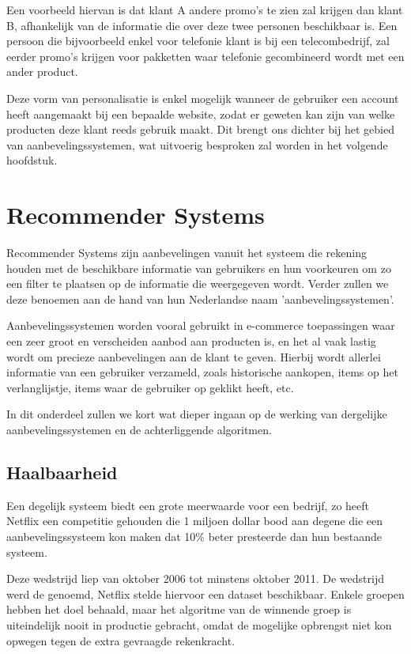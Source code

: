 Een voorbeeld hiervan is dat klant A andere promo's te zien zal krijgen dan klant B, afhankelijk van de informatie die over deze twee personen beschikbaar is. Een persoon die bijvoorbeeld enkel voor telefonie klant is bij een telecombedrijf, zal eerder promo's krijgen voor pakketten waar telefonie gecombineerd wordt met een ander product.

Deze vorm van personalisatie is enkel mogelijk wanneer de gebruiker een account heeft aangemaakt bij een bepaalde website, zodat er geweten kan zijn van welke producten deze klant reeds gebruik maakt. Dit brengt ons dichter bij het gebied van aanbevelingssystemen, wat uitvoerig besproken zal worden in het volgende hoofdstuk.

\section{Recommender Systems}
\label{sec:Recommender Systems}
Recommender Systems \autocite{Resnick1997} zijn aanbevelingen vanuit het systeem die rekening houden met de beschikbare informatie van gebruikers en hun voorkeuren om zo een filter te plaatsen op de informatie die weergegeven wordt. Verder zullen we deze benoemen aan de hand  van hun Nederlandse naam 'aanbevelingssystemen'.

Aanbevelingssystemen worden vooral gebruikt in e-commerce toepassingen waar een zeer groot en verscheiden aanbod aan producten is, en het al vaak lastig wordt om precieze aanbevelingen aan de klant te geven. Hierbij wordt allerlei informatie van een gebruiker verzameld, zoals historische aankopen, items op het verlanglijstje, items waar de gebruiker op geklikt heeft, etc.

In dit onderdeel zullen we kort wat dieper ingaan op de werking van dergelijke aanbevelingssystemen en de achterliggende algoritmen.

\subsection{Haalbaarheid}
\label{sec:Haalbaarheid}

Een degelijk systeem biedt een grote meerwaarde voor een bedrijf, zo heeft Netflix een competitie gehouden die 1 miljoen dollar bood aan degene die een aanbevelingssysteem kon maken dat 10\% beter presteerde dan hun bestaande systeem. 

Deze wedstrijd liep van oktober 2006 tot minstens oktober 2011. De wedstrijd werd de \cite{NetflixPrize} genoemd, Netflix stelde hiervoor een dataset beschikbaar. Enkele groepen hebben het doel behaald, maar het algoritme van de winnende groep is uiteindelijk nooit in productie gebracht, omdat de mogelijke opbrengst niet kon opwegen tegen de extra gevraagde rekenkracht. 

